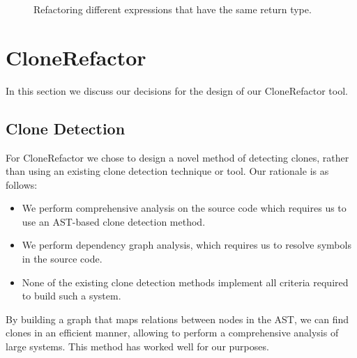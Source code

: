 \begin{figure}[H]
\begin{parcolumns}{2}
\end{parcolumns}
\caption{Refactoring different expressions that have the same return type.}
\label{fig:samereturn}
\end{figure}


\section{CloneRefactor}
In this section we discuss our decisions for the design of our CloneRefactor tool.

\subsection{Clone Detection}
For CloneRefactor we chose to design a novel method of detecting clones, rather than using an existing clone detection technique or tool. Our rationale is as follows:
\begin{itemize}
  \item We perform comprehensive analysis on the source code which requires us to use an AST-based clone detection method.
  \item We perform dependency graph analysis, which requires us to resolve symbols in the source code.
  \item None of the existing clone detection methods implement all criteria required to build such a system.
\end{itemize}
By building a graph that maps relations between nodes in the AST, we can find clones in an efficient manner, allowing to perform a comprehensive analysis of large systems. This method has worked well for our purposes.

